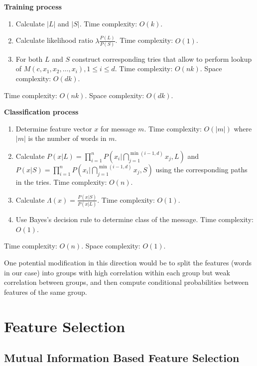 \documentclass[12pt]{report}
\begin{document}
\textbf{Training process}

\begin{enumerate}
	\item Calculate $|L|$ and $|S|$. Time complexity: $O(k)$.
	\item Calculate likelihood ratio $\lambda \frac{P(L)}{P(S)}$. Time complexity: $O(1)$.
	\item For both $L$ and $S$ construct corresponding tries that allow to perform lookup of $M(c, x_1, x_2, \dots, x_i), 1 \le i \le d$. Time complexity: $O(nk)$. Space complexity: $O(dk)$.
\end{enumerate}

Time complexity: $O(nk)$. Space complexity: $O(dk)$.

\textbf{Classification process}

\begin{enumerate}
	\item Determine feature vector $x$ for message $m$. Time complexity: $O(|m|)$ where $|m|$ is the number of words in $m$.
	\item Calculate $P(x | L) = \prod_{i=1}^{n} P(x_i | \bigcap_{j = 1}^{\min(i - 1, d)} x_j, L)$ and $P(x | S) = \prod_{i=1}^{n} P(x_i | \bigcap_{j = 1}^{\min(i - 1, d)} x_j, S)$ using the corresponding paths in the tries. Time complexity: $O(n)$.
	\item Calculate $\Lambda(x) = \frac{P(x | S)}{P(x | L)}$. Time complexity: $O(1)$.
	\item Use Bayes's decision rule to determine class of the message. Time complexity: $O(1)$.
\end{enumerate}

Time complexity: $O(n)$. Space complexity: $O(1)$.

One potential modification in this direction would be to split the features (words in our case) into groups with high correlation within each group but weak correlation between groups, and then compute conditional probabilities between features of the same group.

\newpage


\chapter{Feature Selection}

\section{Mutual Information Based Feature Selection}
\end{document}
